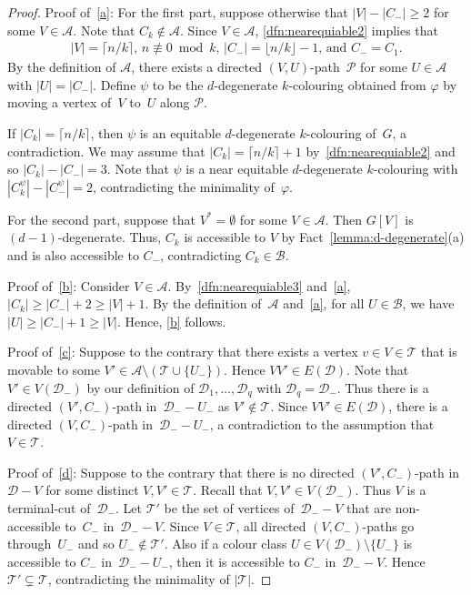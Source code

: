 \documentclass[11pt]{article}
\theoremstyle{plain}
\numberwithin{equation}{section}
\begin{document}
	
	
	\begin{proof}	
	Proof of~\ref{a}: For the first part, suppose otherwise that $|V|-|C_-|  \ge 2$ for some $V\in \mathcal{A}$. Note that $C_k \notin \mathcal{A}$.
	Since $V \in \mathcal{A}$, \ref{dfn:nearequiable2} implies that
	\begin{align*}
	\text{$|V|  =  \lceil n/k \rceil$,  $n \not \equiv 0 \bmod{k}$,  $|C_-| = \lfloor n/k \rfloor-1$, and $C_- = C_1$.}
	\end{align*}
	By the definition of $\mathcal{A}$, there exists a directed $(V,U)$-path~$\mathcal{P}$ for some $U \in \mathcal{A}$ with $|U| = |C_-|$.
	Define $\psi$ to be the $d$-degenerate $k$-colouring obtained from $\varphi$ by moving a vertex of~$V$ to~$U$ along $\mathcal{P}$.
	
	If $|C_k| = \lceil n/k \rceil$, then $\psi$ is an equitable $d$-degenerate $k$-colouring of~$G$, a contradiction.
	We may assume that $|C_k| = \lceil n/k \rceil+1$ by~\ref{dfn:nearequiable2} and so $|C_k| - |C_-| = 3$.
	Note that $\psi$ is a near equitable $d$-degenerate $k$-colouring with $|C_k^\psi| - |C_-^\psi| = 2$, contradicting the minimality of~$\varphi$.
	
For the second part, suppose that $V^*=\emptyset$ for some  $V\in \mathcal{A}$.
Then $G[V]$ is $(d-1)$-degenerate. Thus, $C_k$ is accessible to $V$ by Fact~\ref{lemma:d-degenerate}(a) and is also accessible to $C_-$, contradicting $C_k\in \mathcal{B}$.
	
	Proof of~\ref{b}:
	Consider $V \in \mathcal{A}$.
	By~\ref{dfn:nearequiable3} and~\ref{a}, $|C_k| \ge |C_-|+2 \ge  |V| +1$.
	By the definition of~$\mathcal{A}$ and~\ref{a}, for all $U \in \mathcal{B}$, we have $|U| \ge |C_-| +1 \ge |V|$.
	Hence, \ref{b} follows.

	

		Proof of~\ref{c}:
	Suppose to the contrary that there exists a vertex $v \in V\in \mathcal{T}$ that is movable to some $V'\in \mathcal{A}\setminus (\mathcal{T}\cup \{U_-\}) $.
	Hence $VV' \in E(\mathcal{D})$.
	Note that $V' \in V(\mathcal{D}_-)$ by our definition of $\mathcal{D}_1, \ldots, \mathcal{D}_q$ with $\mathcal{D}_q = \mathcal{D}_-$.
	Thus there is a directed  $(V', C_-)$-path in~$\mathcal{D}_- - U_-$ as $V' \notin \mathcal{T}$.
	Since $VV' \in E(\mathcal{D})$, there is a directed $(V, C_-)$-path in~$\mathcal{D}_- - U_-$,  a contradiction to the assumption that $V\in \mathcal{T}$.

		
	Proof of~\ref{d}: Suppose to the contrary that there is no directed $(V',C_-)$-path in $\mathcal{D}-V$ for some distinct $V,V' \in \mathcal{T}$.
	Recall that $V,V' \in V(\mathcal{D}_-)$.
	Thus $V$ is a terminal-cut of~$\mathcal{D}_-$.
	Let $\mathcal{T}'$ be the set of vertices of~$\mathcal{D}_- - V$  that are
non-accessible to~$C_-$ in~$\mathcal{D}_- - V$.
	Since $V \in \mathcal{T}$, all directed $(V,C_-)$-paths go through~$U_-$ and so $U_- \not\in \mathcal{T}'$.
	Also if a colour class $U \in  V(\mathcal{D}_-) \setminus \{U_-\}$ is accessible to $C_-$ in~$\mathcal{D}_- - U_-$, then it is accessible to $C_-$ in~$\mathcal{D}_- - V$.
	Hence $\mathcal{T}' \subsetneq \mathcal{T}$, contradicting the minimality of $|\mathcal{T}|$.
	

\end{proof}
\end{document}
